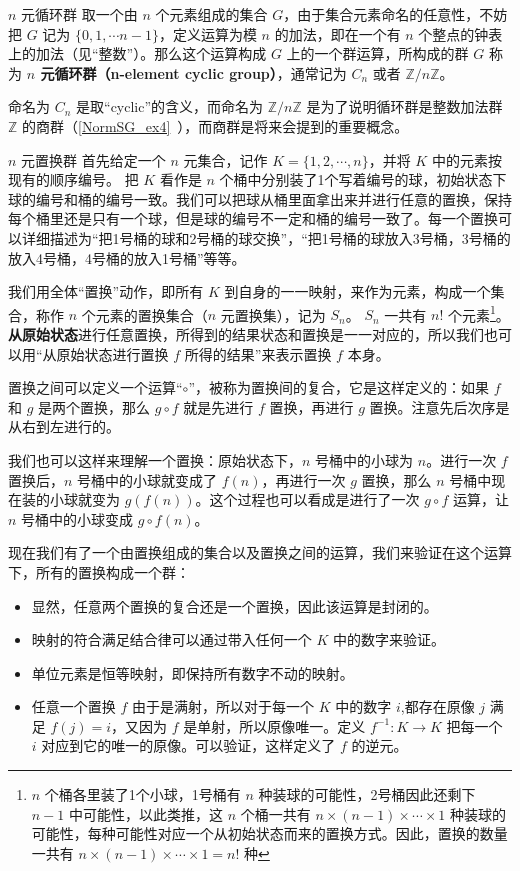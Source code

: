 \begin{example}{$n$ 元循环群}\label{Group_ex2}
取一个由 $n$ 个元素组成的集合 $G$，由于集合元素命名的任意性，不妨把 $G$ 记为 $\{0, 1, \cdots n-1\}$，定义运算为模 $n$ 的加法，即在一个有 $n$ 个整点的钟表上的加法（见“整数”）。那么这个运算构成 $G$ 上的一个群运算，所构成的群 $G$ 称为 \textbf{$n$ 元\textbf{循环群（n-element cyclic group）}}，通常记为 $C_n$ 或者 $\mathbb{Z}/n\mathbb{Z}$。

命名为 $C_n$ 是取“cyclic”的含义，而命名为 $\mathbb{Z}/n\mathbb{Z}$ 是为了说明循环群是整数加法群 $\mathbb{Z}$ 的商群（\autoref{NormSG_ex4}~），而商群是将来会提到的重要概念。
\end{example}

\begin{example}{$n$ 元置换群}\label{Group_ex3}
首先给定一个 $n$ 元集合，记作 $K=\{1,2, \cdots, n\}$，并将 $K$ 中的元素按现有的顺序编号。 把 $K$ 看作是 $n$ 个桶中分别装了1个写着编号的球，初始状态下球的编号和桶的编号一致。我们可以把球从桶里面拿出来并进行任意的置换，保持每个桶里还是只有一个球，但是球的编号不一定和桶的编号一致了。每一个置换可以详细描述为“把1号桶的球和2号桶的球交换”，“把1号桶的球放入3号桶，3号桶的放入4号桶，4号桶的放入1号桶”等等。

我们用全体“置换”动作，即所有 $K$ 到自身的一一映射，来作为元素，构成一个集合，称作 $n$ 个元素的置换集合（$n$ 元置换集），记为 $S_n$。 $S_n$ 一共有 $n!$ 个元素\footnote{$n$ 个桶各里装了1个小球，1号桶有 $n$ 种装球的可能性，2号桶因此还剩下 $n-1$ 中可能性，以此类推，这 $n$ 个桶一共有 $n\times(n-1)\times\cdots\times1$ 种装球的可能性，每种可能性对应一个从初始状态而来的置换方式。因此，置换的数量一共有 $n\times(n-1)\times\cdots\times1=n!$ 种}。 \textbf{从原始状态}进行任意置换，所得到的结果状态和置换是一一对应的，所以我们也可以用“从原始状态进行置换 $f$ 所得的结果”来表示置换 $f$ 本身。

置换之间可以定义一个运算“$\circ$”，被称为置换间的复合，它是这样定义的：如果 $f$ 和 $g$ 是两个置换，那么 $g\circ f$ 就是先进行 $f$ 置换，再进行 $g$ 置换。注意先后次序是从右到左进行的。

我们也可以这样来理解一个置换：原始状态下，$n$ 号桶中的小球为 $n$。进行一次 $f$ 置换后，$n$ 号桶中的小球就变成了 $f(n)$，再进行一次 $g$ 置换，那么 $n$ 号桶中现在装的小球就变为 $g(f(n))$。这个过程也可以看成是进行了一次 $g\circ f$ 运算，让 $n$ 号桶中的小球变成 $g\circ f(n)$。

现在我们有了一个由置换组成的集合以及置换之间的运算，我们来验证在这个运算下，所有的置换构成一个群：
\begin{itemize}
\item 显然，任意两个置换的复合还是一个置换，因此该运算是封闭的。
\item 映射的符合满足结合律可以通过带入任何一个 $K$ 中的数字来验证。
\item 单位元素是恒等映射，即保持所有数字不动的映射。
\item 任意一个置换 $f$ 由于是满射，所以对于每一个 $K$ 中的数字 $i$,都存在原像 $j$ 满足 $f(j)=i$，又因为 $f$ 是单射，所以原像唯一。定义 $f^{-1}:K\rightarrow K$ 把每一个 $i$ 对应到它的唯一的原像。可以验证，这样定义了 $f$ 的逆元。
\end{itemize}


\end{example}
